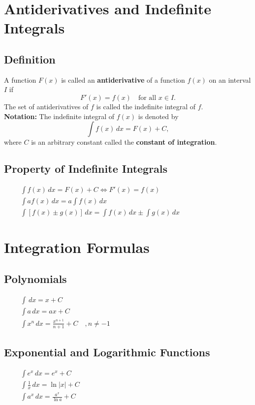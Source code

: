 \documentclass[11pt]{article}
\begin{document}
\pagestyle{plain}
\begin{center}
  \tableofcontents
\end{center}
\newpage
\setcounter{page}{1}
\pagestyle{fancy}

\section{Antiderivatives and Indefinite Integrals}
\subsection{Definition}
A function $F(x)$ is called an \textbf{antiderivative} of a function $f(x)$ on an interval $I$ if
\[
    F'(x) = f(x) \quad \text{for all } x \in I.
\]The set of antiderivatives of $f$ is called the indefinite integral of $f$.\\[.5em]
\textbf{Notation:}
The indefinite integral of $f(x)$ is denoted by
\[
    \int f(x)\,dx = F(x) + C,
\]
where $C$ is an arbitrary constant called the \textbf{constant of integration}.
\subsection{Property of Indefinite Integrals}
$
  \begin{array}{l}
    \displaystyle
    \qquad\int f(x)\,dx = F(x)+C \iff F'(x) = f(x)\\[10pt]
    \displaystyle
    \qquad\int af(x)\,dx = a\int f(x)\,dx\\[10pt]
    \displaystyle
    \qquad\int [f(x)\pm g(x)]\,dx = \int f(x)\,dx \pm \int g(x)\, dx
  \end{array}
$
\section{Integration Formulas}
\subsection{Polynomials}
$
  \begin{array}{l}
    \displaystyle
    \qquad\int \,dx = x + C\\[10pt]
    \displaystyle
    \qquad\int a\,dx = ax + C\\[10pt]
    \displaystyle
    \qquad\int x^n\,dx = \frac{x^{n+1}}{n+1}+C\quad, n\neq-1
  \end{array}
$
\subsection{Exponential and Logarithmic Functions}
$
  \begin{array}{l}
  \qquad\displaystyle \int  e^x\,dx = e^x+C\\[10pt]
  \qquad\displaystyle \int \frac{1}{x}\,dx= \ln|x|+C\\[10pt]
  \qquad\displaystyle \int a^x\,dx = \frac{a^x}{\ln a}+C
  \end{array}
$
\end{document}
